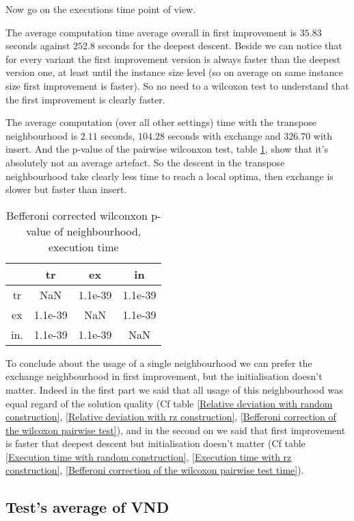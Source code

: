 \documentclass[12pt,a4paper]{article}
\begin{document}
Now go on the executions time point of view.

The average computation time average overall in first improvement is $35.83$ seconds against $252.8$ seconds for the deepest descent. Beside we can notice that for every variant the first improvement version is always faster than the deepest version one, at least until the instance size level (so on average on same instance size first improvement is faster). So no need to a wilcoxon test to understand that the first improvement is clearly faster.

The average computation (over all other settings) time with the transpose neighbourhood is $2.11$ seconds, $104.28$ seconds with exchange and $326.70$ with insert. And the p-value of the pairwise wilconxon test, table \ref{Befferoni corrected wilconxon p-value of neighbourhood time}, show that it's absolutely not an average artefact. So the descent in the transpose neighbourhood take clearly less time to reach a local optima, then exchange is slower but faster than insert.
\begin{table}[!h]
\centering
\begin{tabular}{|*{4}{c|}}
  \hline
   & tr & ex & in\\
  \hline
	tr & NaN & 1.1e-39 & 1.1e-39 \\
	ex & 1.1e-39 & NaN & 1.1e-39 \\
	in. & 1.1e-39 & 1.1e-39 & NaN \\
  \hline
\end{tabular}
\caption{Befferoni corrected wilconxon p-value of neighbourhood, execution time}
\label{Befferoni corrected wilconxon p-value of neighbourhood time}
\end{table}

To conclude about the usage of a single neighbourhood we can prefer the exchange neighbourhood in first improvement, but the initialisation doesn't matter. Indeed in the first part we said that all usage of this neighbourhood was equal regard of the solution quality (Cf table \ref{Relative deviation with random construction}, \ref{Relative deviation with rz construction}, \ref{Befferoni correction of the wilcoxon pairwise test}), and in the second on we said that first improvement is faster that deepest descent but initialisation doesn't matter (Cf table \ref{Execution time with random construction}, \ref{Execution time with rz construction}, \ref{Befferoni correction of the wilcoxon pairwise test time}).

\subsection{Test's average of VND}
\end{document}
